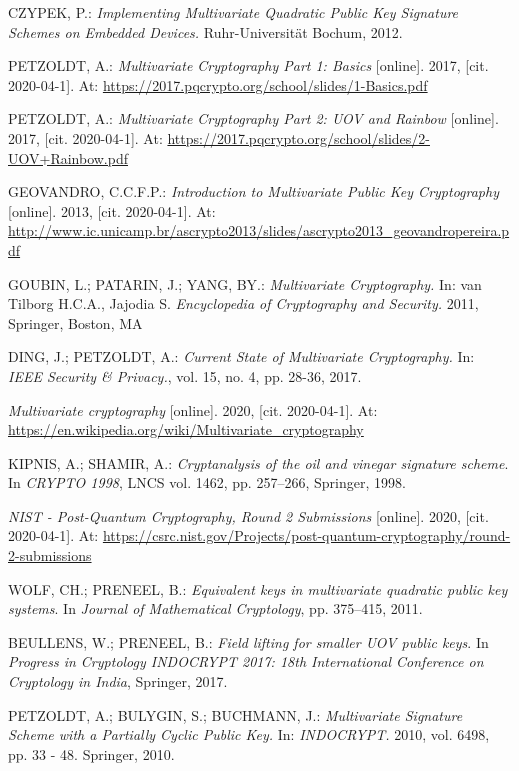 \documentclass[thesis=M,english]{FITthesis}[2019/12/23]
\begin{document}
\begin{thebibliography}{9}
CZYPEK, P.: \textit{Implementing Multivariate Quadratic Public Key Signature Schemes on
Embedded Devices.}  Ruhr-Universit\"{a}t Bochum, 2012.

PETZOLDT, A.: \textit{Multivariate Cryptography Part 1: Basics} [online]. 2017, [cit. 2020-04-1]. At: \url{https://2017.pqcrypto.org/school/slides/1-Basics.pdf}

PETZOLDT, A.: \textit{Multivariate Cryptography Part 2: UOV and Rainbow} [online]. 2017, [cit. 2020-04-1]. At: \url{https://2017.pqcrypto.org/school/slides/2-UOV+Rainbow.pdf}

GEOVANDRO, C.C.F.P.: \textit{Introduction to Multivariate Public Key Cryptography} [online]. 2013, [cit. 2020-04-1]. At: \url{http://www.ic.unicamp.br/ascrypto2013/slides/ascrypto2013_geovandropereira.pdf}

GOUBIN, L.; PATARIN, J.; YANG, BY.: \textit{Multivariate Cryptography.} In: van Tilborg H.C.A., Jajodia S. \textit{Encyclopedia of Cryptography and Security.} 2011, Springer, Boston, MA

DING, J.; PETZOLDT, A.: \textit{Current State of Multivariate Cryptography.} In: \textit{IEEE Security \& Privacy.}, vol. 15, no. 4, pp. 28-36, 2017.

\textit{Multivariate cryptography} [online]. 2020, [cit. 2020-04-1]. At: \url{https://en.wikipedia.org/wiki/Multivariate_cryptography}

KIPNIS, A.; SHAMIR, A.: \textit{Cryptanalysis of the oil and vinegar signature scheme}. In \textit{CRYPTO 1998}, LNCS vol. 1462, pp. 257–266, Springer, 1998.

\textit{NIST - Post-Quantum Cryptography, Round 2 Submissions} [online]. 2020, [cit. 2020-04-1]. At: \url{https://csrc.nist.gov/Projects/post-quantum-cryptography/round-2-submissions}

WOLF, CH.; PRENEEL, B.: \textit{Equivalent keys in multivariate quadratic public key systems}. In \textit{Journal of Mathematical Cryptology}, pp. 375–415, 2011.

BEULLENS, W.; PRENEEL, B.: \textit{Field lifting for smaller UOV public keys}. In \textit{Progress
in Cryptology INDOCRYPT 2017: 18th International Conference on Cryptology in India}, Springer, 2017.

PETZOLDT, A.; BULYGIN, S.; BUCHMANN, J.: \textit{Multivariate
Signature Scheme with a Partially Cyclic Public Key.} In: \textit{INDOCRYPT.} 2010, vol. 6498, pp. 33 - 48. Springer, 2010.


\end{thebibliography}
\end{document}
